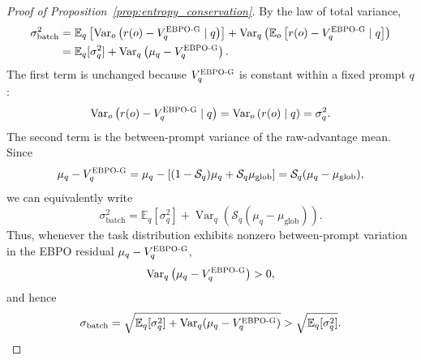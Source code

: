 \documentclass{article}
\theoremstyle{plain}
\theoremstyle{definition}
\theoremstyle{remark}
\newcommand{\oursG}{\textsc{EBPO-G}\xspace}
\begin{document}
\begin{proof}[Proof of Proposition~\ref{prop:entropy_conservation}]
By the law of total variance,
\begin{align}
    \sigma_{\mathrm{batch}}^2
    &=
    \mathbb{E}_q
    \left[
        \operatorname{Var}_{o}
        \left(
            r(o)-V_q^{\oursG}
            \mid q
        \right)
    \right]
    +
    \operatorname{Var}_q
    \left(
        \mathbb{E}_{o}
        \left[
            r(o)-V_q^{\oursG}
            \mid q
        \right]
    \right) \nonumber \\
    &=
    \mathbb{E}_q[\sigma_q^2]
    +
    \operatorname{Var}_q
    \left(
        \mu_q - V_q^{\oursG}
    \right).
    \label{eq:corrected_ebpo_batch_variance}
\end{align}
The first term is unchanged because $V_q^{\oursG}$ is constant within a fixed prompt $q$:
\[
    \operatorname{Var}_{o}
    \left(
        r(o)-V_q^{\oursG}
        \mid q
    \right)
    =
    \operatorname{Var}_{o}
    \left(
        r(o)\mid q
    \right)
    =
    \sigma_q^2.
\]
The second term is the between-prompt variance of the raw-advantage mean. Since
\[
    \mu_q - V_q^{\oursG}
    =
    \mu_q
    -
    \left[
        (1-\mathcal S_q)\mu_q
        +
        \mathcal S_q\mu_{\mathrm{glob}}
    \right]
    =
    \mathcal S_q(\mu_q-\mu_{\mathrm{glob}}),
\]
we can equivalently write
\[
    \sigma_{\mathrm{batch}}^2
    =
    \mathbb{E}_q[\sigma_q^2]
    +
    \operatorname{Var}_q
    \left(
        \mathcal S_q(\mu_q-\mu_{\mathrm{glob}})
    \right).
\]
Thus, whenever the task distribution exhibits nonzero between-prompt variation in the EBPO residual
$\mu_q-V_q^{\oursG}$,
\[
    \operatorname{Var}_q
    \left(
        \mu_q - V_q^{\oursG}
    \right)
    >
    0,
\]
and hence
\begin{equation}
    \sigma_{\mathrm{batch}}
    =
    \sqrt{
        \mathbb{E}_q[\sigma_q^2]
        +
        \operatorname{Var}_q(\mu_q - V_q^{\oursG})
    }
    >
    \sqrt{\mathbb{E}_q[\sigma_q^2]}. \label{step1}
\end{equation}


\end{proof}
\end{document}
